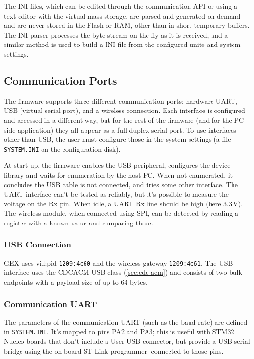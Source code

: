 The INI files, which can be edited through the communication \gls{API} or using a text editor with the virtual mass storage, are parsed and generated on demand and are never stored in the Flash or \gls{RAM}, other than in short temporary buffers. The INI parser processes the byte stream on-the-fly as it is received, and a similar method is used to build a INI file from the configured units and system settings.

\subsection{Communication Ports} \label{sec:com-ports}

The firmware supports three different communication ports: hardware \gls{UART}, \gls{USB} (virtual serial port), and a wireless connection. Each interface is configured and accessed in a different way, but for the rest of the firmware (and for the \gls{PC}-side application) they all appear as a full duplex serial port. To use interfaces other than \gls{USB}, the user must configure those in the system settings (a file \verb|SYSTEM.INI| on the configuration disk).

At start-up, the firmware enables the \gls{USB} peripheral, configures the device library and waits for enumeration by the host \gls{PC}. When not enumerated, it concludes the \gls{USB} cable is not connected, and tries some other interface. The \gls{UART} interface can't be tested as reliably, but it's possible to measure the voltage on the Rx pin. When idle, a \gls{UART} Rx line should be high (here 3.3\,V). The wireless module, when connected using \gls{SPI}, can be detected by reading a register with a known value and comparing those.

\subsubsection{USB Connection}

GEX uses vid:pid \verb|1209:4c60| and the wireless gateway \verb|1209:4c61|. The \gls{USB} interface uses the \gls{CDCACM} \gls{USB} class (\ref{sec:cdc-acm}) and consists of two bulk endpoints with a payload size of up to 64 bytes.

\subsubsection{Communication UART}

The parameters of the communication \gls{UART} (such as the baud rate) are defined in \verb|SYSTEM.INI|. It's mapped to pins PA2 and PA3; this is useful with STM32 Nucleo boards that don't include a User \gls{USB} connector, but provide a \gls{USB}-serial bridge using the on-board ST-Link programmer, connected to those pins.

